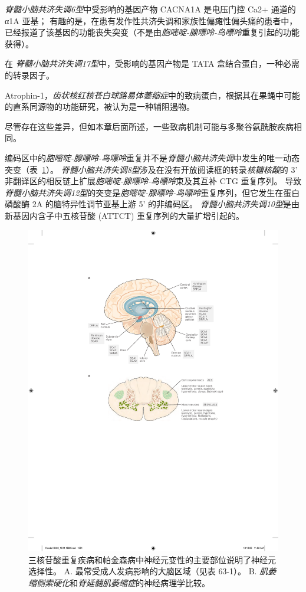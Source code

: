\textit{脊髓小脑共济失调6型}中受影响的基因产物 CACNA1A 是电压门控 Ca2+ 通道的 α1A 亚基；
有趣的是，在患有发作性共济失调和家族性偏瘫性偏头痛的患者中，已经报道了该基因的功能丧失突变（不是由\textit{胞嘧啶-腺嘌呤-鸟嘌呤}重复引起的功能获得）。


在 \textit{脊髓小脑共济失调17型}中，受影响的基因产物是 TATA 盒结合蛋白，一种必需的转录因子。


Atrophin-1，\textit{齿状核红核苍白球路易体萎缩症}中的致病蛋白，根据其在果蝇中可能的直系同源物的功能研究，被认为是一种辅阻遏物。


尽管存在这些差异，但如本章后面所述，一些致病机制可能与多聚谷氨酰胺疾病相同。


编码区中的\textit{胞嘧啶-腺嘌呤-鸟嘌呤}重复并不是\textit{脊髓小脑共济失调}中发生的唯一动态突变（表~\ref{fig:63_2}）。
\textit{脊髓小脑共济失调8型}涉及在没有开放阅读框的转录\textit{核糖核酸}的 3' 非翻译区的相反链上扩展\textit{胞嘧啶-腺嘌呤-鸟嘌呤}束及其互补 CTG 重复序列。
导致\textit{脊髓小脑共济失调12型}的突变是\textit{胞嘧啶-腺嘌呤-鸟嘌呤}重复序列，但它发生在蛋白磷酸酶 2A 的脑特异性调节亚基上游 5' 的非编码区。
\textit{脊髓小脑共济失调10型}是由新基因内含子中五核苷酸 (ATTCT) 重复序列的大量扩增引起的。


\begin{figure}[htbp]
	\centering
	\includegraphics[width=0.7\linewidth]{chap63/fig_63_2}
	\caption{三核苷酸重复疾病和帕金森病中神经元变性的主要部位说明了神经元选择性。
		A. 最常受成人发病影响的大脑区域（见表 63-1）。
		B. \textit{肌萎缩侧索硬化}和\textit{脊延髓肌萎缩症}的神经病理学比较。}
	\label{fig:63_2}
\end{figure}


